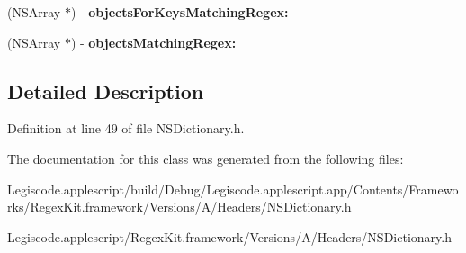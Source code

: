 \begin{DoxyCompactItemize}
\item 
\hypertarget{interface_n_s_dictionary_07_regex_kit_additions_08_a2654f85f2a52134280d5aabaef4013b8}{(N\-S\-Array $\ast$) -\/ {\bfseries objects\-For\-Keys\-Matching\-Regex\-:}}\label{interface_n_s_dictionary_07_regex_kit_additions_08_a2654f85f2a52134280d5aabaef4013b8}

\item 
\hypertarget{interface_n_s_dictionary_07_regex_kit_additions_08_a5e920d8e766291e735c7b3db3947833d}{(N\-S\-Array $\ast$) -\/ {\bfseries objects\-Matching\-Regex\-:}}\label{interface_n_s_dictionary_07_regex_kit_additions_08_a5e920d8e766291e735c7b3db3947833d}

\end{DoxyCompactItemize}


\subsection{Detailed Description}


Definition at line 49 of file N\-S\-Dictionary.\-h.



The documentation for this class was generated from the following files\-:\begin{DoxyCompactItemize}
\item 
Legiscode.\-applescript/build/\-Debug/\-Legiscode.\-applescript.\-app/\-Contents/\-Frameworks/\-Regex\-Kit.\-framework/\-Versions/\-A/\-Headers/N\-S\-Dictionary.\-h\item 
Legiscode.\-applescript/\-Regex\-Kit.\-framework/\-Versions/\-A/\-Headers/N\-S\-Dictionary.\-h\end{DoxyCompactItemize}
